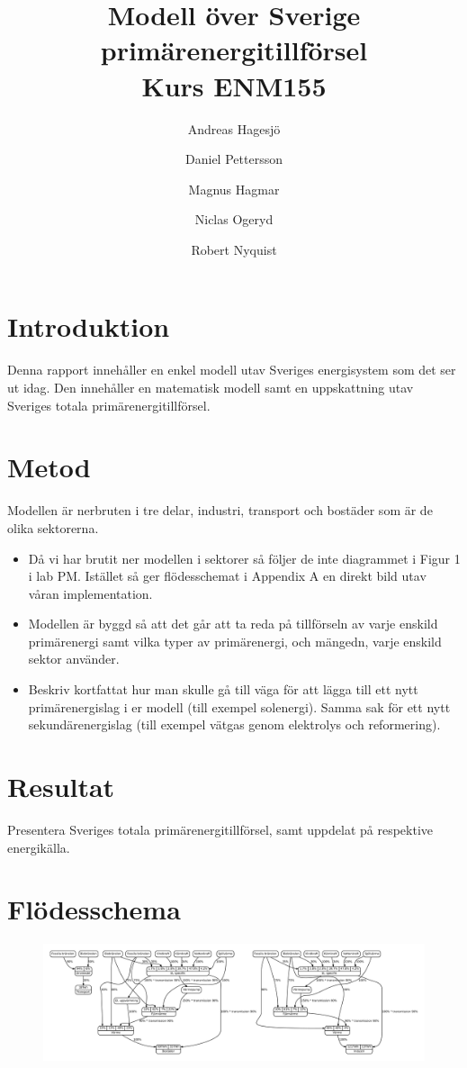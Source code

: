 \documentclass[a4paper,11pt,fleqn]{article}
\author{Andreas Hagesjö \and Daniel Pettersson \and
Magnus Hagmar \and Niclas Ogeryd \and Robert Nyquist}
\title{Modell över Sverige primärenergitillförsel \\ Kurs ENM155}
\begin{document}
\maketitle

\section{Introduktion}
Denna rapport innehåller en enkel modell utav Sveriges energisystem som det ser ut idag.
Den innehåller en matematisk modell samt en uppskattning utav Sveriges totala primärenergitillförsel.


\section{Metod}
Modellen är nerbruten i tre delar, industri, transport och bostäder som är de olika sektorerna.


\begin{itemize}
\item Då vi har brutit ner modellen i sektorer så följer de inte diagrammet i Figur 1 i lab PM.
Istället så ger flödesschemat i Appendix A en direkt bild utav våran implementation.


\item Modellen är byggd så att det går att ta reda på tillförseln av varje enskild primärenergi samt vilka typer av primärenergi, och mängedn, varje enskild sektor använder.

\item

Beskriv kortfattat hur man skulle gå till väga för att lägga till ett
nytt primärenergislag i er modell (till exempel solenergi). Samma sak för
ett nytt sekundärenergislag (till exempel vätgas genom elektrolys och
reformering).
\end{itemize}

\section{Resultat}
Presentera Sveriges totala primärenergitillförsel, samt uppdelat på
respektive energikälla.

\appendix
\section{Flödesschema}
\begin{figure}[h!]
	\centering 
 		\includegraphics[scale = 0.2]{diagram.pdf}
		\label{diagram}
\end{figure}
\end{document}
